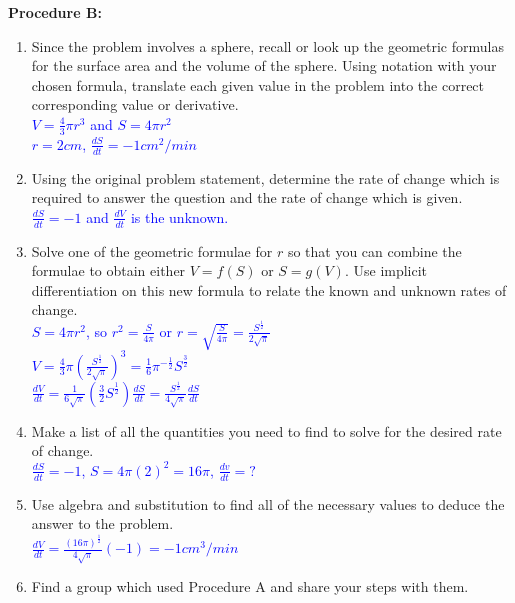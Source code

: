 \documentclass{ximera}
\begin{document}
\begin{exercise} \textbf{Procedure B:}
\begin{enumerate}
    \item Since the problem involves a sphere, recall or look up the geometric formulas for the surface area and the volume of the sphere.  Using notation with your chosen formula, translate each given value in the problem into the correct corresponding value or derivative.\\
    \textcolor{blue}{ $V=\frac{4}{3}\pi r^3$ and $S=4\pi r^2$\\
    $r=2 cm$, $\frac{dS}{dt}=-1 cm^2/min$}
    
    \item Using the original problem statement, determine the rate of change which is required to answer the question and the rate of change which is given.\\
    \textcolor{blue}{ $\frac{dS}{dt}=-1$ and $\frac{dV}{dt}$ is the unknown.}
    
    \item Solve one of the geometric formulae for $r$ so that you can combine the formulae to obtain either $V=f(S)$ or $S=g(V)$. Use implicit differentiation on this new formula to relate the known and unknown rates of change.\\
    \textcolor{blue}{$S=4\pi r^2$, so $r^2=\frac{S}{4\pi}$ or $r=\sqrt{\frac{S}{4\pi}}=\frac{S^\frac12}{2\sqrt{\pi}}$\\
    $V=\frac{4}{3}\pi(\frac{S^{\frac12}}{2\sqrt{\pi}})^3=\frac{1}{6}\pi^{-\frac12}S^{\frac32}$\\
    $\frac{dV}{dt}=\frac{1}{6\sqrt{\pi}}(\frac32S^{\frac12})\frac{dS}{dt}=\frac{S^{\frac12}}{4\sqrt{\pi}}\frac{dS}{dt}$}
    
    \item Make a list of all the quantities you need to find to solve for the desired rate of change.\\
    \textcolor{blue}{ $\frac{dS}{dt}=-1$, $S=4\pi(2)^2=16\pi$, $\frac{dv}{dt}=?$}
    
    
    
    \item Use algebra and substitution to find all of the necessary values to deduce the answer to the problem.  \\
    \textcolor{blue}{$\frac{dV}{dt}=\frac{(16\pi)^{\frac12}}{4\sqrt{\pi}}(-1)=-1 cm^3/min$}
    
    \item Find a group which used Procedure A and share your steps with them.
\end{enumerate}
\end{exercise}
\end{document}
